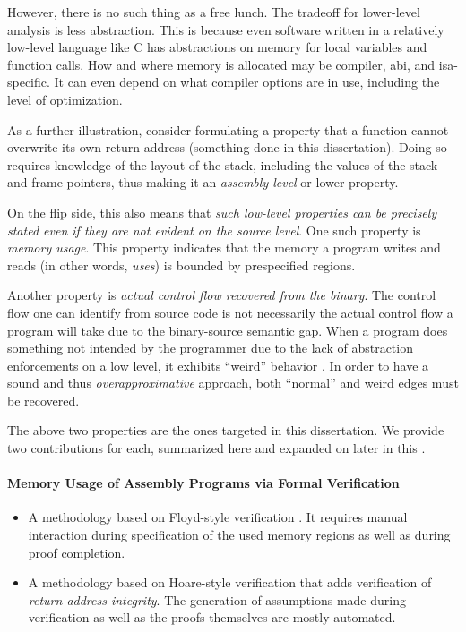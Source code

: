 However, there is no such thing as a free lunch.
The tradeoff for lower-level analysis is less abstraction.
This is because even software written in a relatively low-level language like C has abstractions on memory for local variables and function calls.
How and where memory is allocated may be compiler, \ac{abi}, and \ac{isa}-specific.
It can even depend on what compiler options are in use, including the level of optimization.
\begin{example}\label{ex:rop}
  As a further illustration, consider formulating a property that a function cannot overwrite its own return address (something done in this dissertation).
  Doing so requires knowledge of the layout of the stack, including the values of the stack and frame pointers, thus making it an \emph{assembly-level} or lower property.
\end{example}
On the flip side, this also means that \emph{such low-level properties can be precisely stated even if they are not evident on the source level}.
One such property is \emph{memory usage}.
This property indicates that the memory a program writes and reads (in other words, \emph{uses}) is bounded by prespecified regions.

Another property is \emph{actual control flow recovered from the binary}.
The control flow one can identify from source code is not necessarily the actual control flow a program will take due to the binary-source semantic gap.
When a program does something not intended by the programmer due to the lack of abstraction enforcements on a low level, it exhibits ``weird'' behavior \autocite{shapiro2013weird,dullien2017weird}.
In order to have a sound and thus \emph{overapproximative} approach, both ``normal'' and weird edges must be recovered.

The above two properties are the ones targeted in this dissertation.
We provide two contributions for each, summarized here and expanded on later in this .
\paragraph{Memory Usage of Assembly Programs via Formal Verification}
\begin{itemize}
  \item A methodology based on Floyd-style verification \autocite{floyd1967assigning}.
  It requires manual interaction during specification of the used memory regions as well as during proof completion.
  \item A methodology based on Hoare-style verification \autocite{hoare1969axiomatic} that adds verification of \emph{return address integrity}.
  The generation of assumptions made during verification as well as the proofs themselves are mostly automated.
\end{itemize}

